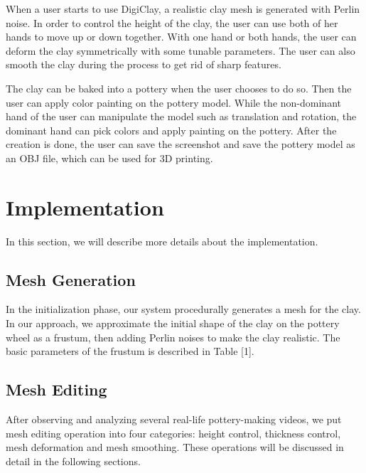 When a user starts to use DigiClay, a realistic clay mesh is generated with Perlin noise. In order to control the height of the clay, the user can use both of her hands to move up or down together. With one hand or both hands, the user can deform the clay symmetrically with some tunable parameters. The user can also smooth the clay during the process to get rid of sharp features.

The clay can be baked into a pottery when the user chooses to do so. Then the user can apply color painting on the pottery model. While the non-dominant hand of the user can manipulate the model such as translation and rotation, the dominant hand can pick colors and apply painting on the pottery. After the creation is done, the user can save the screenshot and save the pottery model as an OBJ file, which can be used for 3D printing.












\section{Implementation}
\label{sec:1}

In this section, we will describe more details about the implementation. 



\subsection{Mesh Generation}
\label{sec:2}

In the initialization phase, our system procedurally generates a mesh for the clay. In our approach, we approximate the initial shape of the clay on the pottery wheel as a frustum, then adding Perlin noises to make the clay realistic. The basic parameters of the frustum is described in Table [1].


\subsection{Mesh Editing}
\label{sec:2}
After observing and analyzing several real-life pottery-making videos, we put mesh editing operation into four categories: height control, thickness control, mesh deformation and mesh smoothing. These operations will be discussed in detail in the following sections.


